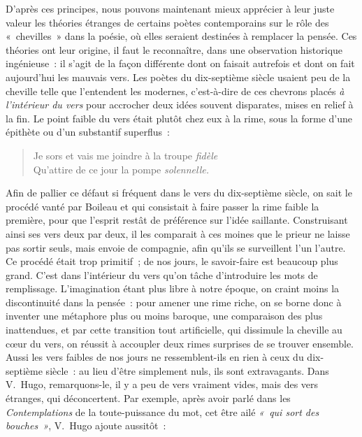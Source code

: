 \documentclass[french,twoside]{book} %
\begin{document}
D’après ces principes, nous pouvons maintenant mieux apprécier à leur juste valeur les théories étranges de certains poètes contemporains sur le rôle des « chevilles » dans la poésie, où elles seraient destinées à remplacer la pensée. Ces théories ont leur origine, il faut le reconnaître, dans une observation historique ingénieuse : il s’agit de la façon différente dont on faisait autrefois et dont on fait aujourd’hui les mauvais vers. Les poètes du dix-septième siècle usaient peu de la cheville telle que l’entendent les modernes, c’est-à-dire de ces chevrons placés \emph{à l’intérieur du vers} pour accrocher deux idées souvent disparates, mises en relief à la fin. Le point faible du vers était plutôt chez eux à la rime, sous la forme d’une épithète ou d’un substantif superflus :\par


\begin{verse}
Je sors et vais me joindre à la troupe \emph{fidèle}\\
Qu’attire de ce jour la pompe \emph{solennelle.}\\
\end{verse}

\noindent Afin de pallier ce défaut si fréquent dans le vers du dix-septième siècle, on sait le procédé vanté par Boileau et qui consistait à faire passer la rime faible la première, pour que l’esprit restât de préférence sur l’idée saillante. Construisant ainsi ses vers deux par deux, il les comparait à ces moines que le prieur ne laisse pas sortir seuls, mais envoie de compagnie, afin qu’ils se surveillent l’un l’autre. Ce procédé était trop primitif ; de nos jours, le savoir-faire est beaucoup plus grand. C’est dans l’intérieur du vers qu’on  tâche d’introduire les mots de remplissage. L’imagination étant plus libre à notre époque, on craint moins la discontinuité dans la pensée : pour amener une rime riche, on se borne donc à inventer une métaphore plus ou moins baroque, une comparaison des plus inattendues, et par cette transition tout artificielle, qui dissimule la cheville au cœur du vers, on réussit à accoupler deux rimes surprises de se trouver ensemble. Aussi les vers faibles de nos jours ne ressemblent-ils en rien à ceux du dix-septième siècle : au lieu d’être simplement nuls, ils sont extravagants. Dans V. Hugo, remarquons-le, il y a peu de vers vraiment vides, mais des vers étranges, qui déconcertent. Par exemple, après avoir parlé dans les \emph{Contemplations} de la toute-puissance du mot, cet être ailé \emph{« qui sort des \emph{bouches} »}, V. Hugo ajoute aussitôt :\par
\end{document}
